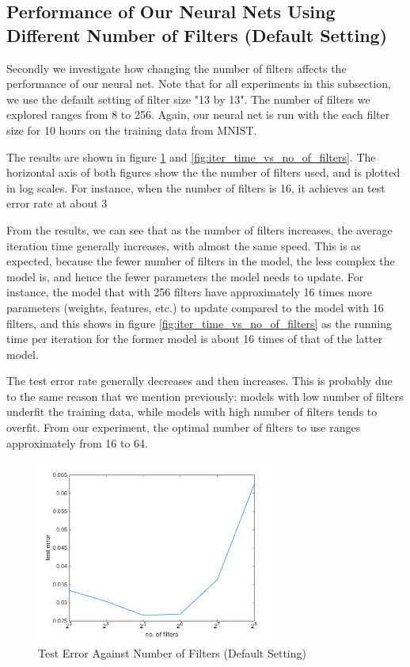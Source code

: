 \documentclass[10pt,twocolumn]{article}
\begin{document}
\FloatBarrier

\subsection{Performance of Our Neural Nets Using Different Number of Filters (Default Setting)}

Secondly we investigate how changing the number of filters affects the performance of our neural net. Note that for all experiments in this subsection, we use the default setting of filter size "13 by 13". The number of filters we explored ranges from 8 to 256. Again, our neural net is run with the each filter size for 10 hours on the training data from MNIST.

The results are shown in figure \ref{fig:test_error_vs_no_of_filters} and \ref{fig:iter_time_vs_no_of_filters}. The horizontal axis of both figures show the the number of filters used, and is plotted in log scales. For instance, when the number of filters is 16, it achieves an test error rate at about 3%

From the results, we can see that as the number of filters increases, the average iteration time generally increases, with almost the same speed. This is as expected, because the fewer number of filters in the model, the less complex the model is, and hence the fewer parameters the model needs to update. For instance, the model that with 256 filters have approximately 16 times more parameters (weights, features, etc.) to update compared to the model with 16 filters, and this shows in figure \ref{fig:iter_time_vs_no_of_filters} as the running time per iteration for the former model is about 16 times of that of the latter model.

The test error rate generally decreases and then increases. This is probably due to the same reason that we mention previously: models with low number of filters underfit the training data, while models with high number of filters tends to overfit. From our experiment, the optimal number of filters to use ranges approximately from 16 to 64.

\begin{figure}
\centering
\includegraphics[width = 8cm]{figure/test_error_vs_no_of_filters}
\caption{Test Error Against Number of Filters (Default Setting)}
\label{fig:test_error_vs_no_of_filters}
\end{figure}
\end{document}
